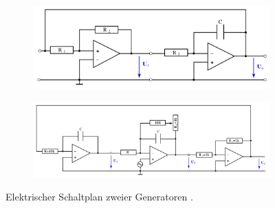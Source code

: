 \begin{figure}[H]
	\centering
    \begin{subfigure}{\textwidth}
        \centering
        \includegraphics[width=0.8\linewidth]{figures/Generator.png}
        \caption{}
        \label{fig:Generator_einzeln}
    \end{subfigure}
    \begin{subfigure}{\textwidth}
        \centering
        \includegraphics[width=0.8\linewidth]{figures/Generator-varyingAmplitudes.png}
        \caption{}
        \label{fig:Generator-varyingAmplitudes}
    \end{subfigure}
    \caption{Elektrischer Schaltplan zweier Generatoren \cite{Anleitung51}.}
    \label{fig:Generator}
\end{figure}


